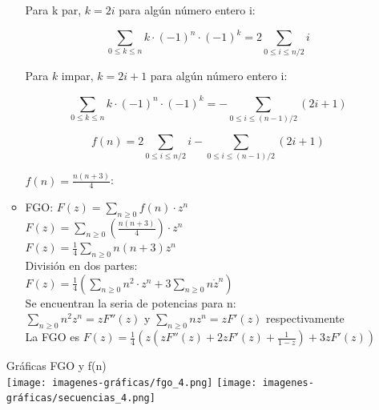 \begin{enumerate}
\begin{itemize}
            Para k par, $k=2i$ para algún número entero i:
            
            $$\sum_{0\leq k\leq n} {k\cdot (-1)^n\cdot (-1)^k} = 2\sum_{0\leq i\leq n/2}{i}$$
            
            Para $k$ impar, $k = 2i+1$ para algún número entero i:
            
            $$\sum_{0\leq k\leq n} {k\cdot (-1)^n\cdot (-1)^k} = -\sum_{0\leq i\leq (n-1)/2}{(2i+1)}$$
            
            $$f(n) = 2\sum_{0\leq i\leq n/2}{i} - \sum_{0\leq i\leq (n-1)/2}{(2i+1)}$$
            
            $f(n)= \frac{n(n+3)}{4}$:
    
    \item FGO: $F(z) = \sum_{n\geq0} f(n) \cdot z^n$\\
        $F(z) = \sum_{n\geq0} \left(\frac{n(n+3)}{4}\right) \cdot z^n$\\
        $F(z) = \frac{1}{4} \sum_{n\geq0} n(n+3) z^n $\\
        División en dos partes:\\
        $F(z)= \frac{1}{4} \left(\sum_{n\geq0} n^2 \cdot z^n + 3\sum_{n\geq0} n \dot z^n\right)$\\
        Se encuentran la seria de potencias para n: \\ $\sum_{n\geq0} n^2 z^n = zF''(z)$ y $\sum_{n\geq0} n z^n = zF'(z)$ respectivamente\\
        La FGO es $F(z)= \frac{1}{4}\left(z\left(zF''(z) + 2zF'(z) + \frac{1}{1-z}\right) + 3zF'(z)\right)$
    \end{itemize}
    Gráficas FGO y f(n)\\
    \texttt{[image: imagenes-gráficas/fgo\_4.png]}
    \texttt{[image: imagenes-gráficas/secuencias\_4.png]}
    

\end{enumerate}
